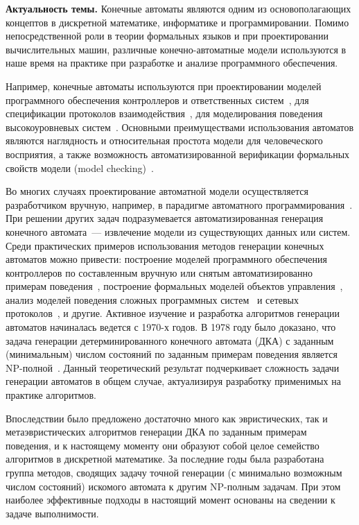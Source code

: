 \textbf{Актуальность темы.} 
Конечные автоматы являются одним из основополагающих концептов в дискретной математике, информатике и программировании.
Помимо непосредственной роли в теории формальных языков и при проектировании вычислительных машин, различные конечно-автоматные модели используются в наше время на практике при разработке и анализе программного обеспечения.

Например, конечные автоматы используются при проектировании моделей программного обеспечения контроллеров и ответственных систем~\cite{shalyto-automata-2010,DBLP:conf/setta/PatilDV15}, для спецификации протоколов взаимодействия~\cite{DBLP:conf/coordination/JongmansHA14}, для моделирования поведения высокоуровневых систем~\cite{DBLP:journals/ese/HeuleV13,wagner2006modeling}.
Основными преимуществами использования автоматов являются наглядность и относительная простота модели для человеческого восприятия, а также возможность автоматизированной верификации формальных свойств модели (model checking)~\cite{clarke2018model}.

Во многих случаях проектирование автоматной модели осуществляется разработчиком вручную, например, в парадигме автоматного программирования~\cite{shalyto-automata-2010}.
При решении других задач подразумевается автоматизированная генерация конечного автомата~--- извлечение модели из существующих данных или систем.
Среди практических примеров использования методов генерации конечных автоматов можно привести: построение моделей программного обеспечения контроллеров по составленным вручную или снятым автоматизированно примерам поведения~\cite{DBLP:conf/etfa/ChivilikhinBUSS18}, построение формальных моделей объектов управления~\cite{DBLP:conf/etfa/BuzhinskyV17,DBLP:journals/tii/BuzhinskyV17}, анализ моделей поведения сложных программных систем~\cite{DBLP:journals/tosem/CookW98,DBLP:conf/sigsoft/BertolinoIPT09,DBLP:journals/ese/HeuleV13} и сетевых протоколов~\cite{DBLP:conf/sp/SivakornAPKJ17}, и другие.
Активное изучение и разработка алгоритмов генерации автоматов начиналась ведется с 1970-х годов.
В 1978 году было доказано, что задача генерации детерминированного конечного автомата (ДКА) с заданным (минимальным) числом состояний по заданным примерам поведения является NP-полной~\cite{DBLP:journals/iandc/Gold78}.
Данный теоретический результат подчеркивает сложность задачи генерации автоматов в общем случае, актуализируя разработку применимых на практике алгоритмов.

Впоследствии было предложено достаточно много как эвристических, так и метаэвристических алгоритмов генерации ДКА по заданным примерам поведения, и к настоящему моменту они образуют собой целое семейство алгоритмов в дискретной математике.
За последние годы была разработана группа методов, сводящих задачу точной генерации (с минимально возможным числом состояний) искомого автомата к другим NP-полным задачам.
При этом наиболее эффективные подходы в настоящий момент основаны на сведении к задаче выполнимости.

